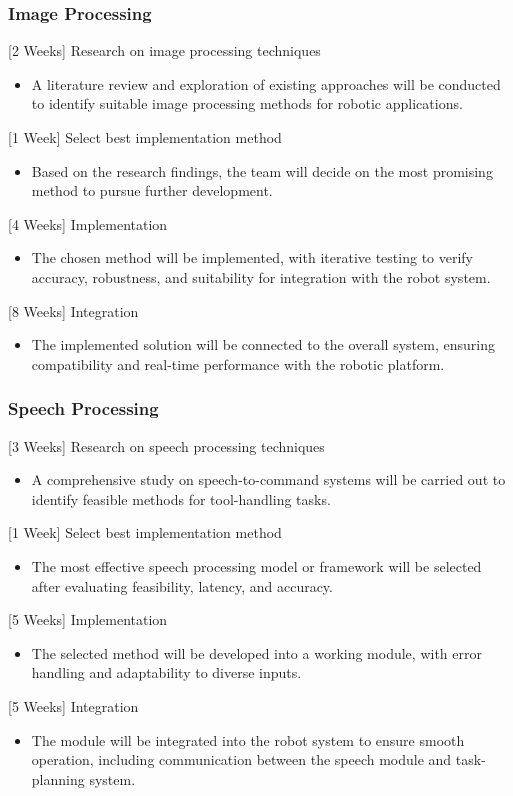 \documentclass[12pt]{extarticle}
\begin{document}
\subsubsection{Image Processing}
[2 Weeks] Research on image processing techniques 
\begin{itemize}
    \item A literature review and exploration of existing approaches will be conducted to identify suitable image processing methods for robotic applications.
\end{itemize}
[1 Week] Select best implementation method
\begin{itemize}
    \item Based on the research findings, the team will decide on the most promising method to pursue further development.
\end{itemize}
[4 Weeks] Implementation
\begin{itemize}
    \item The chosen method will be implemented, with iterative testing to verify accuracy, robustness, and suitability for integration with the robot system.
\end{itemize}
[8 Weeks] Integration
\begin{itemize}
    \item The implemented solution will be connected to the overall system, ensuring compatibility and real-time performance with the robotic platform.
\end{itemize}
\subsubsection{Speech Processing}
[3 Weeks] Research on speech processing techniques
\begin{itemize}
    \item A comprehensive study on speech-to-command systems will be carried out to identify feasible methods for tool-handling tasks.
\end{itemize}
[1 Week] Select best implementation method
\begin{itemize}
    \item The most effective speech processing model or framework will be selected after evaluating feasibility, latency, and accuracy.
\end{itemize}
[5 Weeks] Implementation
\begin{itemize}
    \item The selected method will be developed into a working module, with error handling and adaptability to diverse inputs.
\end{itemize}
[5 Weeks] Integration
\begin{itemize}
    \item The module will be integrated into the robot system to ensure smooth operation, including communication between the speech module and task-planning system.
\end{itemize}
\end{document}
